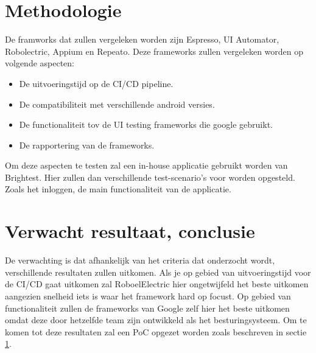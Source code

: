 \section{Methodologie}%
\label{sec:methodologie}

De framworks dat zullen vergeleken worden zijn Espresso, UI Automator, Robolectric, Appium en Repeato.
Deze frameworks zullen vergeleken worden op volgende aspecten:
\begin{itemize}
	\item De uitvoeringstijd op de CI/CD pipeline.
	\item De compatibiliteit met verschillende android versies.
	\item De functionaliteit tov de UI testing frameworks die google gebruikt.
	\item De rapportering van de frameworks.
\end{itemize}

Om deze aspecten te testen zal een in-house applicatie gebruikt worden van Brightest.
Hier zullen dan verschillende test-scenario's voor worden opgesteld. Zoals het inloggen, de main functionaliteit van de applicatie.

\section{Verwacht resultaat, conclusie}%
\label{sec:verwachte_resultaten}

De verwachting is dat afhankelijk van het criteria dat onderzocht wordt, verschillende resultaten zullen uitkomen.
Als je op gebied van uitvoeringstijd voor de CI/CD gaat uitkomen zal RoboelElectric hier ongetwijfeld het beste uitkomen aangezien snelheid iets is waar het framework hard op focust. Op gebied van functionaliteit zullen de frameworks van Google zelf hier het beste uitkomen omdat deze door hetzelfde team zijn ontwikkeld als het besturingsysteem. Om te komen tot deze resultaten zal een PoC opgezet worden zoals beschreven in sectie \ref{sec:methodologie}.


